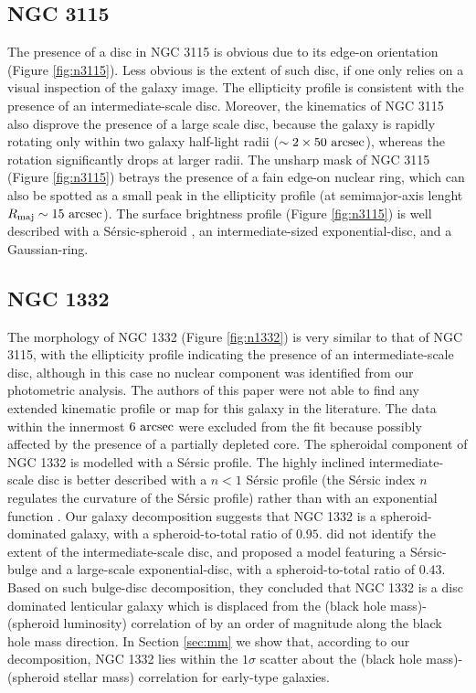 \documentclass[useAMS,usenatbib,article]{mn2e}
\begin{document}
\subsection{NGC 3115}
The presence of a disc in NGC 3115 is obvious due to its edge-on orientation (Figure \ref{fig:n3115}). 
Less obvious is the extent of such disc, if one only relies on a visual inspection of the galaxy image. 
The ellipticity profile is consistent with the presence of an intermediate-scale disc. 
Moreover, the kinematics of NGC 3115 \citep{arnold2011n3115} also disprove the presence of a large scale disc, 
because the galaxy is rapidly rotating only within two galaxy half-light radii ($\sim 2 \times 50~\rm arcsec$), 
whereas the rotation significantly drops at larger radii.  
The unsharp mask of NGC 3115 (Figure \ref{fig:n3115}) betrays the presence of a fain edge-on nuclear ring, 
which can also be spotted as a small peak in the ellipticity profile 
(at semimajor-axis lenght $R_{\rm maj} \sim 15~\rm arcsec$).
The surface brightness profile (Figure \ref{fig:n3115}) is well described with a S\'ersic-spheroid \citep{sersic1963},  
an intermediate-sized exponential-disc, and a Gaussian-ring. 


\subsection{NGC 1332}
The morphology of NGC 1332 (Figure \ref{fig:n1332}) is very similar to that of NGC 3115, 
with the ellipticity profile indicating the presence of an intermediate-scale disc, 
although in this case no nuclear component was identified from our photometric analysis. 
The authors of this paper were not able to find any extended kinematic profile or map 
for this galaxy in the literature. 
The data within the innermost $6~\rm arcsec$ were excluded from the fit 
because possibly affected by the presence of a partially depleted core.
The spheroidal component of NGC 1332 is modelled with a S\'ersic profile. 
The highly inclined intermediate-scale disc is better described with a $n<1$ S\'ersic profile 
(the S\'ersic index $n$ regulates the curvature of the S\'ersic profile) 
rather than with an exponential function \citep{pastrav2013a}. 
Our galaxy decomposition suggests that NGC 1332 is a spheroid-dominated galaxy, 
with a spheroid-to-total ratio of $0.95$.
\cite{rusli2011} did not identify the extent of the intermediate-scale disc, 
and proposed a model featuring a S\'ersic-bulge and a large-scale exponential-disc, 
with a spheroid-to-total ratio of $0.43$.
Based on such bulge-disc decomposition, they concluded that NGC 1332 is a disc dominated lenticular galaxy 
which is displaced from the (black hole mass)-(spheroid luminosity) correlation of \cite{marconihunt2003} 
by an order of magnitude along the black hole mass direction. 
In Section \ref{sec:mm} we show that, according to our decomposition, 
NGC 1332 lies within the $1\sigma$ scatter about the (black hole mass)-(spheroid stellar mass) correlation 
for early-type galaxies. 
\end{document}

